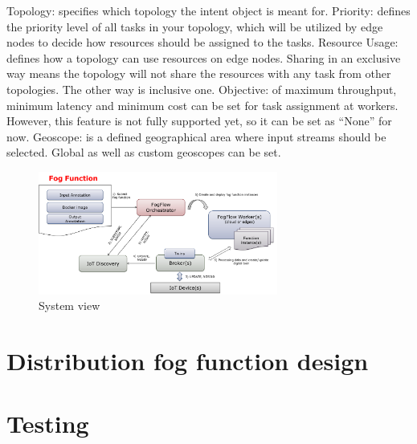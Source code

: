 \documentclass[11pt]{article}
\begin{document}
Topology: specifies which topology the intent object is meant for.
Priority: defines the priority level of all tasks in your topology, which will be utilized by edge nodes to decide how resources should be assigned to the tasks.
Resource Usage: defines how a topology can use resources on edge nodes. Sharing in an exclusive way means the topology will not share the resources with any task from other topologies. The other way is inclusive one.
Objective: of maximum throughput, minimum latency and minimum cost can be set for task assignment at workers. However, this feature is not fully supported yet, so it can be set as “None” for now.
Geoscope: is a defined geographical area where input streams should be selected. Global as well as custom geoscopes can be set.

\begin{figure}[h]
    \centering
    \includegraphics[width=0.7\textwidth]{Images/function-orchestration.png}
    \caption{System view}
\end{figure}{}
\section{Distribution fog function design}
\section{Testing}


\end{document}
